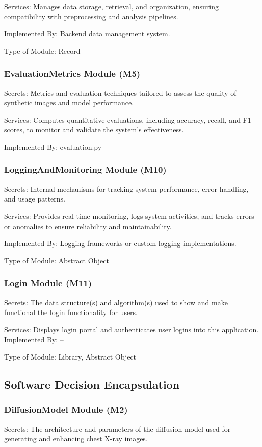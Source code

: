 \documentclass[12pt, titlepage]{article}
\begin{document}
Services: Manages data storage, retrieval, and organization, ensuring compatibility with preprocessing and analysis pipelines.

Implemented By: Backend data management system.

Type of Module: Record

\subsubsection{EvaluationMetrics Module (M5)}
Secrets: Metrics and evaluation techniques tailored to assess the quality of synthetic images and model performance.

Services: Computes quantitative evaluations, including accuracy, recall, and F1 scores, to monitor and validate the system’s effectiveness.

Implemented By: evaluation.py

\subsubsection{LoggingAndMonitoring Module (M10)}
Secrets: Internal mechanisms for tracking system performance, error handling, and usage patterns.

Services: Provides real-time monitoring, logs system activities, and tracks errors or anomalies to ensure reliability and maintainability.

Implemented By: Logging frameworks or custom logging implementations.

Type of Module: Abstract Object

\subsubsection{Login Module (M11)}
Secrets: The data structure(s) and algorithm(s) used to show and make functional the login functionality for users.

Services: Displays login portal and authenticates user logins into this application.
Implemented By: –

Type of Module: Library, Abstract Object

\subsection{Software Decision Encapsulation}

\subsubsection{DiffusionModel Module (M2)}
Secrets: The architecture and parameters of the diffusion model used for generating and enhancing chest X-ray images.
\end{document}
